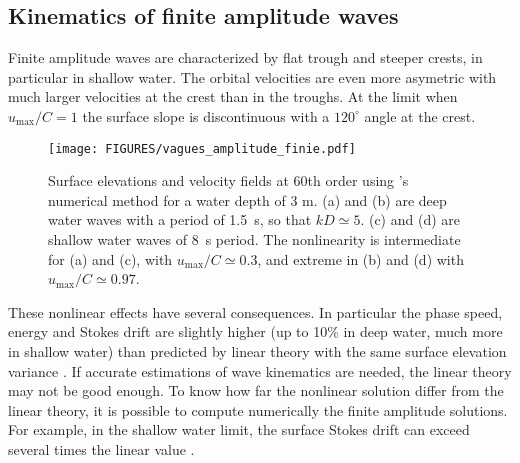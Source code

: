\subsection{Kinematics of finite amplitude waves}
Finite amplitude waves are characterized by flat trough and steeper crests, in particular in shallow water. The orbital 
velocities are even more asymetric with much larger velocities at the crest than in the troughs. At the limit 
when $u_{\mathrm{max}}/C = 1$ the surface slope is discontinuous with a  $120^\circ$  angle at the crest. 
\begin{figure}[htb]
\centerline{\texttt{[image: FIGURES/vagues\_amplitude\_finie.pdf]}}
\caption{Surface elevations and velocity fields at 60th order using \cite{Dalrymple1974}'s numerical method 
for a water depth of 3 m. (a) and (b) are deep water  waves with a period of 1.5~s, so that  $kD\simeq 5$.  
(c) and (d) are shallow water waves of 8~s period. The nonlinearity is intermediate for (a) and (c), with $u_{\mathrm{max}}/C\simeq 0.3$, 
and extreme in (b) and (d)  with $u_{\mathrm{max}}/C\simeq 0.97$.}
\label{Fig_amplitude_finie}
\end{figure}

These nonlinear effects have several consequences. In particular the phase speed, energy and Stokes drift are slightly higher (up to 10\% in deep water, much more in shallow water) than predicted 
by linear theory with the same surface elevation variance  \citep{Cokelet1977}. If accurate estimations of wave kinematics are needed, the linear theory may 
not be good enough. To know how far the nonlinear solution differ from the linear theory, it is possible to compute numerically the finite amplitude solutions. 
For example, in the shallow water limit, the surface Stokes drift can exceed several times the linear value \citep{Ardhuin&al.2008}.



